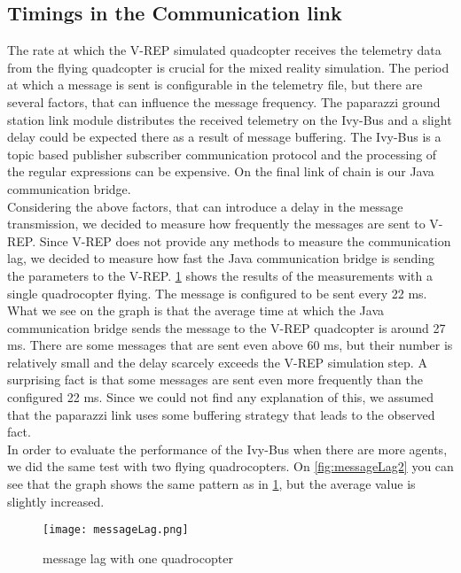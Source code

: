  

\subsection{Timings in the Communication link}
\label{sec:commTiming}


The rate at which the V-REP simulated quadcopter receives the telemetry data from the flying quadcopter is crucial for the mixed reality simulation. 
The period at which a message is sent is configurable in the telemetry file, but there are several factors, that can influence the message frequency. 
The paparazzi ground station link module distributes the received telemetry on the Ivy-Bus and a slight delay could be expected there as a result of message buffering. 
The Ivy-Bus is a topic based publisher subscriber communication protocol and the processing of the regular expressions can be expensive. 
On the final link of chain is our Java communication bridge.\\

Considering the above factors, that can introduce a delay in the message transmission, we decided to measure how frequently the messages are sent to V-REP. 
Since V-REP does not provide any methods to measure the communication lag, we decided to measure how fast the Java communication bridge is sending the parameters to the V-REP. 
\ref{fig:messageLag} shows the results of the measurements with a single quadrocopter flying. 
The message is configured to be sent every 22 ms. 
What we see on the graph is that the average time at which the Java communication bridge sends the message to the V-REP quadcopter is around 27 ms. 
There are some messages that are sent even above 60 ms, but their number is relatively small and the delay scarcely exceeds the V-REP simulation step. 
A surprising fact is that some messages are sent even more frequently than the configured 22 ms. 
Since we could not find any explanation of this, we assumed that the paparazzi link uses some buffering strategy that leads to the observed fact. \\

In order to evaluate the performance of the Ivy-Bus when there are more agents, we did the same test with two flying quadrocopters. 
On \ref{fig:messageLag2} you can see that the graph shows the same pattern as in \ref{fig:messageLag}, but the average value is slightly increased.

\begin{figure}[h!]
 \begin{center}
  \texttt{[image: messageLag.png]}
 \end{center}
  \caption{message lag with one quadrocopter\label{fig:messageLag}}
\end{figure}

